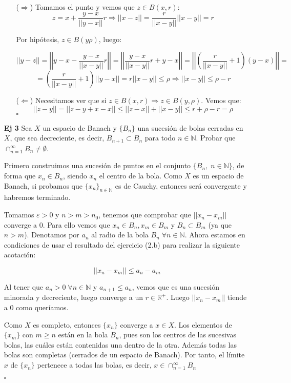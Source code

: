 \documentclass[12pt,letterpaper]{article}
\newcommand{\R}{\mathbb{R}}
\newcommand{\N}{\mathbb{N}}
\newcommand{\norm}[1]{\left|\left| #1 \right|\right|}
\newcommand{\cqd}{\hfill\ensuremath{\square}}
\begin{document}
\begin{enumerate}
\begin{enumerate}
	($\Rightarrow$) Tomamos el punto y vemos que $z\in B(x,r)$:
	\[z=x+\frac{y-x}{\norm{y-x}}r \Rightarrow \norm{x-z}=\frac{r}{\norm{x-y}}\norm{x-y}=r\]
	
Por hipótesis, $z\in B(y\rho)$, luego:

\[
\norm{y-z}= \norm{y-x -\frac{y-x}{\norm{x-y}}r}=\norm{\frac{y-x}{\norm{x-y}}r+y-x}=\norm{\left(\frac{r}{\norm{x-y}}+1\right)(y-x)}=
\]
\[
=\left(\frac{r}{\norm{x-y}}+1\right)\norm{y-x}=r\norm{x-y}\leq \rho \Rightarrow \norm{x-y}\leq \rho -r
\]
	
	($\Leftarrow$) Necesitamos ver que si $z\in B(x,r) \Rightarrow z \in B(y,\rho)$. Vemos que:
	\[\norm{z-y}=\norm{z-y+x-x}\leq\norm{z-x}+\norm{x-y}\leq r+\rho-r=\rho\] 
	\cqd
\end{enumerate}

\item[\textbf{Ej 3}] Sea $X$ un espacio de Banach y $\{B_n \}$ una sucesión de bolas cerradas en $X$, que sea decreciente, es decir, $B_{n+1}\subset B_n$ para todo $n\in \N$. Probar que $\cap^{\infty}_{n=1}B_n\neq\emptyset$.

Primero construimos una sucesión de puntos en el conjunto $\{B_n, \; n\in\N\}$, de forma que $x_n\in B_n$, siendo $x_n$ el centro de la bola. Como $X$ es un espacio de Banach, si probamos que $\{x_n\}_{n\in\N}$ es de Cauchy, entonces será convergente y habremos terminado.

Tomamos $\varepsilon>0$ y $n>m>n_0$, tenemos que comprobar que $\norm{x_n-x_m}$ converge a 0. Para ello vemos que $x_n \in B_n, x_m \in B_m$ y $B_n\subset B_m$ (ya que $n>m$). Denotamos por $a_n$ al radio de la bola $B_n \; \forall n \in\N$. Ahora estamos en condiciones de usar el resultado del ejercicio (2.b) para realizar la siguiente acotación:

\[
\norm{x_n-x_m} \leq a_n - a_m
\]

Al tener que $a_n > 0 \;\forall n \in\N$ y $a_{n+1}\leq a_n$, vemos que es una sucesión minorada y decreciente, luego converge a un $r \in\R^+$. Luego $\norm{x_n-x_m}$ tiende a 0 como queríamos.

Como $X$ es completo, entonces $\{x_n\}$ converge a $x\in X$. Los elementos de $\{x_m\}$ con $m\geq n$ están en la bola $B_n$, pues son los centros de las sucesivas bolas, las cuáles están contenidas una dentro de la otra. Además todas las bolas son completas (cerrados de un espacio de Banach). Por tanto, el límite $x$ de $\{x_n\}$ pertenece a todas las bolas, es decir, $x\in\cap_{n=1}^\infty B_n$

\cqd


\end{enumerate}
\end{document}
